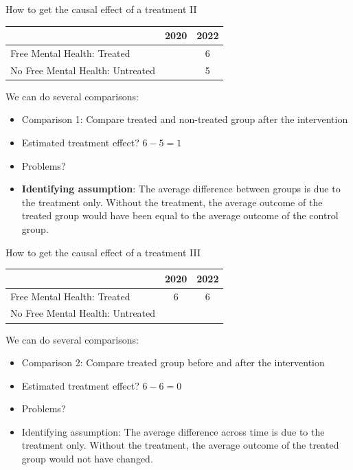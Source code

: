 \documentclass[11pt]{beamer}
\begin{document}
\begin{frame}{How to get the causal effect of a treatment II}


\begin{table}[]
\begin{tabular}{lcc}
\toprule
\textbf{}                        & \textbf{2020} & \textbf{2022} \\ \midrule
Free Mental Health: Treated      &           & 6          \\ \midrule
No Free Mental Health: Untreated &           &  5         \\ \bottomrule
\end{tabular}
\end{table}

We can do several comparisons:
\begin{itemize}[<+- | alert@+>]
\item Comparison 1: Compare treated and non-treated group after the intervention
\item Estimated treatment effect? $6-5=1$
\item Problems?
\item \textbf{Identifying assumption}: The average difference between groups is due to the treatment only. Without the treatment, the average outcome of the treated group would have been equal to the average outcome of the control group.
\end{itemize} 
\end{frame}






\begin{frame}{How to get the causal effect of a treatment III}


\begin{table}[]
\begin{tabular}{lcc}
\toprule
\textbf{}                        & \textbf{2020} & \textbf{2022} \\ \midrule
Free Mental Health: Treated      &    6       & 6          \\ \midrule
No Free Mental Health: Untreated &           &          \\ \bottomrule
\end{tabular}
\end{table}

We can do several comparisons:
\begin{itemize}[<+- | alert@+>]
\item Comparison 2: Compare treated group before and after the intervention
\item Estimated treatment effect? $6-6=0$
\item Problems?
\item Identifying assumption: The average difference across time is due to the treatment only. Without the treatment, the average outcome of the treated group would not have changed.
\end{itemize} 
\end{frame}
\end{document}
